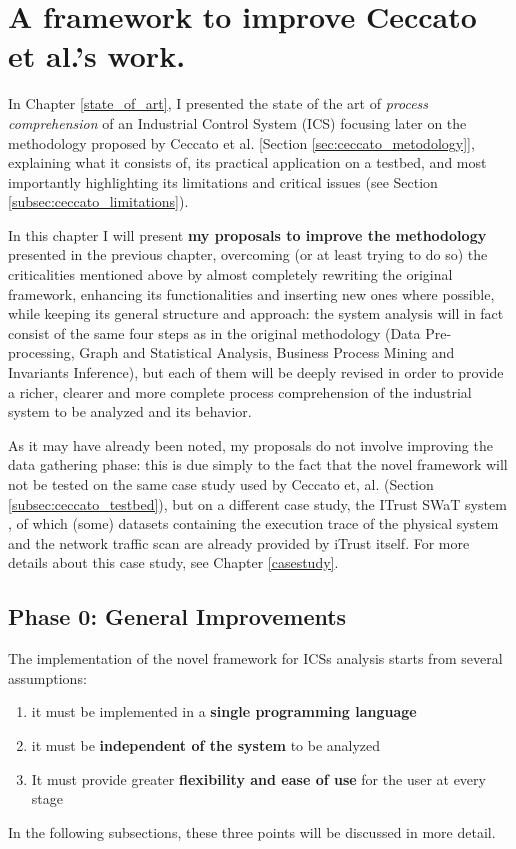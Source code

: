 \chapter{A framework to improve Ceccato et al.’s work.}
\label{proposal}

\linenumbers
In Chapter \ref{state_of_art}, I presented the state of the art of \textit{process comprehension} of an Industrial Control System (ICS) focusing later on the methodology proposed by Ceccato et al. \cite{ceccato}[Section \ref{sec:ceccato_metodology}], explaining what it consists of, its practical application on a testbed, and most importantly highlighting its limitations and critical issues (see Section \ref{subsec:ceccato_limitations}).

\bigskip
In this chapter I will present \textbf{my proposals to improve the methodology} presented in the previous chapter, overcoming (or at least trying to do so) the criticalities mentioned above by almost completely rewriting the original framework, enhancing its functionalities and inserting new ones where possible, while keeping its general structure and approach: the system analysis will in fact consist of the same four steps as in the original methodology (Data Pre-processing, Graph and Statistical Analysis, Business Process Mining and Invariants Inference), but each of them will be deeply revised in order to provide a richer, clearer and more complete process comprehension of the industrial system to be analyzed and its behavior.

\bigskip
As it may have already been noted, my proposals do not involve improving the data gathering phase: this is due simply to the fact that the novel framework will not be tested on the same case study used by Ceccato et, al. (Section \ref{subsec:ceccato_testbed}), but on a different case study, the ITrust SWaT system \cite{swat_home}, of which (some) datasets containing the execution trace of the physical system and the network traffic scan are already provided by iTrust itself. For more details about this case study, see Chapter \ref{casestudy}.

\section{Phase 0: General Improvements}
\label{sec:improve_general}

The implementation of the novel framework for ICSs analysis starts from several assumptions:

\begin{enumerate}
	\item it must be implemented in a \textbf{single programming language}
	\item it must be \textbf{independent of the system} to be analyzed
	\item It must provide greater \textbf{flexibility and ease of use} for the user at every stage
\end{enumerate}
In the following subsections, these three points will be discussed in more detail.

